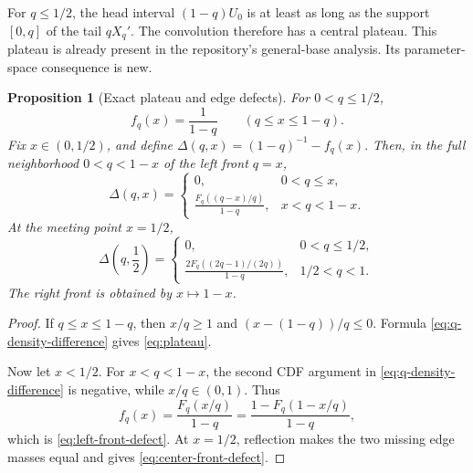\documentclass[11pt,oneside]{article}
\newtheorem{proposition}[theorem]{Proposition}
\theoremstyle{definition}
\theoremstyle{remark}
\begin{document}
For \(q\le1/2\), the head interval \((1-q)U_0\) is at least as long as the support \([0,q]\)
of the tail \(qX_q'\).  The convolution therefore has a central plateau.  This plateau is
already present in the repository's general-base analysis.  Its parameter-space consequence
is new.

\begin{proposition}[Exact plateau and edge defects]
\label{prop:plateau-defect}
For \(0<q\le1/2\),
\begin{equation}
 f_q(x)=\frac1{1-q}
 \qquad(q\le x\le1-q).
 \label{eq:plateau}
\end{equation}
Fix \(x\in(0,1/2)\), and define
\(
 \Delta(q,x)=(1-q)^{-1}-f_q(x).
\)
Then, in the full neighborhood \(0<q<1-x\) of the left front \(q=x\),
\begin{equation}
 \Delta(q,x)=
 \begin{cases}
  0,&0<q\le x,\\[2mm]
  \displaystyle\frac{F_q((q-x)/q)}{1-q},&x<q<1-x.
 \end{cases}
 \label{eq:left-front-defect}
\end{equation}
At the meeting point \(x=1/2\),
\begin{equation}
 \Delta\!\left(q,\frac12\right)=
 \begin{cases}
 0,&0<q\le1/2,\\[2mm]
 \displaystyle\frac{2F_q((2q-1)/(2q))}{1-q},&1/2<q<1.
 \end{cases}
 \label{eq:center-front-defect}
\end{equation}
The right front is obtained by \(x\mapsto1-x\).
\end{proposition}

\begin{proof}
If \(q\le x\le1-q\), then \(x/q\ge1\) and
\((x-(1-q))/q\le0\).  Formula \eqref{eq:q-density-difference} gives
\eqref{eq:plateau}.

Now let \(x<1/2\).  For \(x<q<1-x\), the second CDF argument in
\eqref{eq:q-density-difference} is negative, while \(x/q\in(0,1)\).  Thus
\[
 f_q(x)=\frac{F_q(x/q)}{1-q}
 =\frac{1-F_q(1-x/q)}{1-q},
\]
which is \eqref{eq:left-front-defect}.  At \(x=1/2\), reflection makes the two missing edge
masses equal and gives \eqref{eq:center-front-defect}.
\end{proof}
\end{document}
